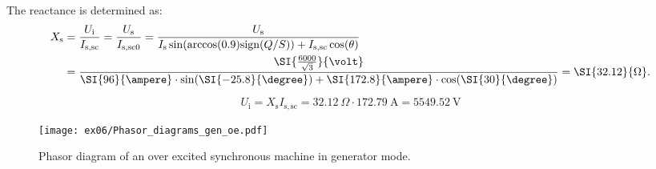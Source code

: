 
\begin{solutionblock}
    The reactance is determined as:
    \begin{align}
        \begin{split}
        X_{\mathrm{s}}
        &= \frac{U_{\mathrm{i}}}{I_{\mathrm{s,sc}}}
        = \frac{U_{\mathrm{s}}}{I_{\mathrm{s,sc0}}}
        = \frac{U_{\mathrm{s}}}{I_{\mathrm{s}}\sin(\arccos(0.9)\mathrm{sign}(Q/S))+I_{\mathrm{s,sc}}\cos(\theta)} \\
        &= \frac{\SI{\frac{6000}{\sqrt{3}}}{\volt}}{\SI{96}{\ampere}\cdot \sin(\SI{-25.8}{\degree}) + \SI{172.8}{\ampere}\cdot \cos(\SI{30}{\degree})}
        = \SI{32.12}{\Omega}.
        \end{split}
    \end{align}

\end{solutionblock}


\begin{solutionblock}
    
    \begin{equation}
        U_{\mathrm{i}} = X_{\mathrm{s}} I_{\mathrm{s,sc}}
        = \SI{32.12}{\Omega} \cdot \SI{172.79}{\ampere}
        = \SI{5549.52}{\volt}
    \end{equation}
\end{solutionblock}





\begin{figure}[ht]
    \centering
    \texttt{[image: ex06/Phasor\_diagrams\_gen\_oe.pdf]}
    \caption{Phasor diagram of an over excited synchronous machine in generator mode.}
    \label{fig:Phasor_diagrams_gen_oe}
\end{figure}


